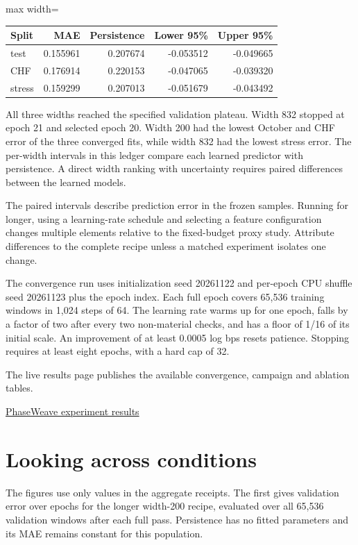 \documentclass[11pt,oneside,openany]{book}
\begin{document}
\begin{center}\footnotesize\sffamily\setlength{\tabcolsep}{3.5pt}\renewcommand{\arraystretch}{1.2}
\begin{adjustbox}{max width=\linewidth}\begin{tabular}{@{}lrrrr@{}}\toprule
Split & MAE & Persistence & Lower 95\% & Upper 95\% \\ \midrule
test & 0.155961 & 0.207674 & -0.053512 & -0.049665 \\
CHF & 0.176914 & 0.220153 & -0.047065 & -0.039320 \\
stress & 0.159299 & 0.207013 & -0.051679 & -0.043492 \\
\bottomrule\end{tabular}\end{adjustbox}\end{center}
All three widths reached the specified validation plateau. Width 832 stopped at epoch 21 and selected epoch 20. Width 200 had the lowest October and CHF error of the three converged fits, while width 832 had the lowest stress error. The per-width intervals in this ledger compare each learned predictor with persistence. A direct width ranking with uncertainty requires paired differences between the learned models.

The paired intervals describe prediction error in the frozen samples. Running for longer, using a learning-rate schedule and selecting a feature configuration changes multiple elements relative to the fixed-budget proxy study. Attribute differences to the complete recipe unless a matched experiment isolates one change.

The convergence run uses initialization seed 20261122 and per-epoch CPU shuffle seed 20261123 plus the epoch index. Each full epoch covers 65,536 training windows in 1,024 steps of 64. The learning rate warms up for one epoch, falls by a factor of two after every two non-material checks, and has a floor of 1/16 of its initial scale. An improvement of at least 0.0005 log bps resets patience. Stopping requires at least eight epochs, with a hard cap of 32.

The live results page publishes the available convergence, campaign and ablation tables.

{\small\sffamily\href{https://amelie-iska.github.io/phaseweave-lab/results.html}{PhaseWeave experiment results}\par}
\chapter{Looking across conditions}
The figures use only values in the aggregate receipts. The first gives validation error over epochs for the longer width-200 recipe, evaluated over all 65,536 validation windows after each full pass. Persistence has no fitted parameters and its MAE remains constant for this population.
\end{document}
